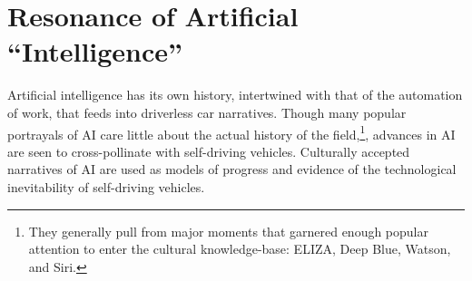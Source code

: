 \section{Resonance of Artificial ``Intelligence''}
Artificial intelligence has its own history, intertwined with that of the
automation of work, that feeds into driverless car narratives. Though many popular
portrayals of AI care little about the actual history of the
field,\footnote{They generally pull from major moments that garnered enough popular
attention to enter the cultural knowledge-base: ELIZA, Deep Blue,
Watson, and Siri.}, advances in AI are seen to cross-pollinate with
self-driving vehicles. Culturally accepted narratives of AI are used
as models of progress and evidence of the technological inevitability
of self-driving vehicles. 



